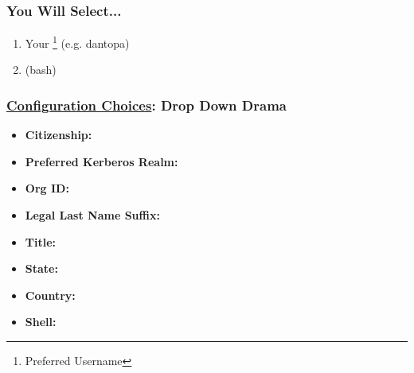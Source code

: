 \begin{frame}\frametitle{You Will Select...}
    \centering
\begin{enumerate}
	\item Your \footnote{Preferred Username} (e.g. dantopa)
	\item {} (bash)
\end{enumerate}
\end{frame}


\begin{frame}\frametitle{\href{https://ieapp.hpc.mil/info/userRequest/newUser}{Configuration Choices}: Drop Down Drama}
    \begin{itemize}
        \item \textbf{Citizenship:} 
        \item \textbf{Preferred Kerberos Realm:} 
        \item \textbf{Org ID:} 
        \item \textbf{Legal Last Name Suffix:} 
        \item \textbf{Title:} 
        \item \textbf{State:} 
        \item \textbf{Country:} 
        \item \textbf{Shell:} 
    \end{itemize}
\end{frame}

